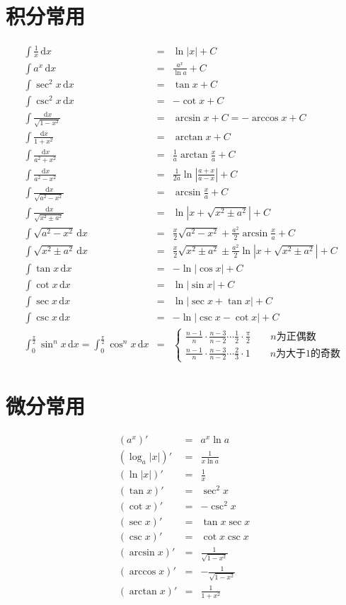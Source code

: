 \documentclass[UTF8]{ctexart}
\newcommand{\ud}{\,\mathrm{d}}
\begin{document}
\section{积分常用}
\begin{eqnarray*}
\int \frac{1}{x}\ud x &=& \ln|x|+C \\
\int a^x \ud x&=&\frac{a^x}{\ln a}+C \\
\int \sec^2 x\ud x &=& \tan x+C \\
\int \csc^2 x\ud x &=& -\cot x+C \\
\int \frac{\ud x}{\sqrt{1-x^2}} &=&\arcsin x+C = -\arccos x+C \\
\int \frac{\ud x}{1+x^2} &=& \arctan x + C \\
\int \frac{\ud x}{a^2+x^2}&=&\frac{1}{a} \arctan\frac{x}{a} +C \\
\int \frac{\ud x}{a^2-x^2}&=&\frac{1}{2a} \ln\left|\frac{a+x}{a-x}\right| +C \\
\int \frac{\ud x}{\sqrt{a^2-x^2}}&=&\arcsin\frac{x}{a} +C \\
\int \frac{\ud x}{\sqrt{x^2\pm a^2}}&=&\ln|x+\sqrt{x^2\pm a^2}| +C \\
\int \sqrt{a^2-x^2}\ud x&=&\frac{x}{2}\sqrt{a^2-x^2}+\frac{a^2}{2}\arcsin\frac{x}{a} +C \\
\int \sqrt{x^2\pm a^2}\ud x&=&\frac{x}{2}\sqrt{x^2\pm a^2}\pm \frac{a^2}{2}\ln|x+\sqrt{x^2\pm a^2}| +C \\
\int \tan x\ud x&=&-\ln|\cos x|+C\\
\int \cot x\ud x&=&\ln|\sin x|+C\\
\int \sec x\ud x&=&\ln|\sec x+\tan x|+C\\
\int \csc x\ud x&=&-\ln|\csc x-\cot x|+C\\
\int_0^{\frac{\pi}{2}} \sin^n x \ud x = \int_0^{\frac{\pi}{2}} \cos^n x \ud x & = & 
\begin{cases}
\frac{n-1}{n} \cdot \frac{n-3}{n-2} \cdots \frac{1}{2} \cdot \frac{\pi}{2} \qquad n\text{为正偶数} \\
\frac{n-1}{n} \cdot \frac{n-3}{n-2} \cdots \frac{2}{3} \cdot 1\qquad n\text{为大于1的奇数}
\end{cases}
\end{eqnarray*}

\section{微分常用}
\begin{eqnarray*}
(a^x)'&=&a^x\ln a\\
(\log_a |x|)' &=& \frac{1}{x\ln a}\\
(\ln |x|)' &=& \frac{1}{x}\\
(\tan x)' &=& \sec^2 x\\
(\cot x)' &=& -\csc^2 x\\
(\sec x)' &=& \tan x\sec x\\
(\csc x)' &=& \cot x\csc x\\
(\arcsin x)' &=& \frac{1}{\sqrt{1-x^2}}\\
(\arccos x)' &=& -\frac{1}{\sqrt{1-x^2}}\\
(\arctan x)' &=& \frac{1}{1+x^2}\\
\end{eqnarray*}
\end{document}
